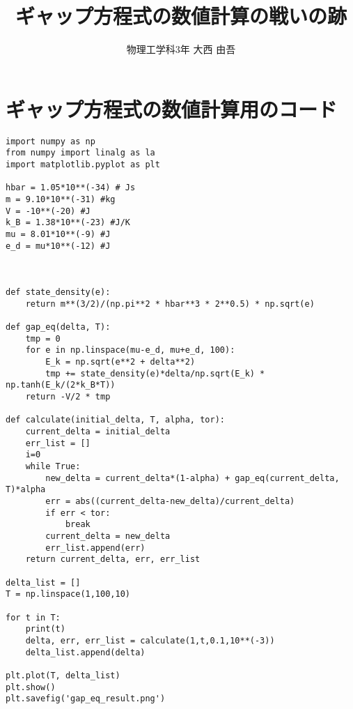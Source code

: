 \documentclass[uplatex,dvipdfmx]{jsarticle}
\title{ギャップ方程式の数値計算の戦いの跡}
\author{物理工学科3年 大西 由吾}
\begin{document}
\section{ギャップ方程式の数値計算用のコード}

\begin{lstlisting}[caption=hoge,label=fuga]
import numpy as np
from numpy import linalg as la
import matplotlib.pyplot as plt

hbar = 1.05*10**(-34) # Js
m = 9.10*10**(-31) #kg
V = -10**(-20) #J
k_B = 1.38*10**(-23) #J/K
mu = 8.01*10**(-9) #J
e_d = mu*10**(-12) #J



def state_density(e):
    return m**(3/2)/(np.pi**2 * hbar**3 * 2**0.5) * np.sqrt(e)

def gap_eq(delta, T):
    tmp = 0
    for e in np.linspace(mu-e_d, mu+e_d, 100):
        E_k = np.sqrt(e**2 + delta**2)
        tmp += state_density(e)*delta/np.sqrt(E_k) * np.tanh(E_k/(2*k_B*T))
    return -V/2 * tmp

def calculate(initial_delta, T, alpha, tor):
    current_delta = initial_delta
    err_list = []
    i=0
    while True:
        new_delta = current_delta*(1-alpha) + gap_eq(current_delta, T)*alpha
        err = abs((current_delta-new_delta)/current_delta)
        if err < tor:
            break
        current_delta = new_delta
        err_list.append(err)
    return current_delta, err, err_list

delta_list = []
T = np.linspace(1,100,10)

for t in T:
    print(t)
    delta, err, err_list = calculate(1,t,0.1,10**(-3))
    delta_list.append(delta)

plt.plot(T, delta_list)
plt.show()
plt.savefig('gap_eq_result.png')
\end{lstlisting}
\end{document}
